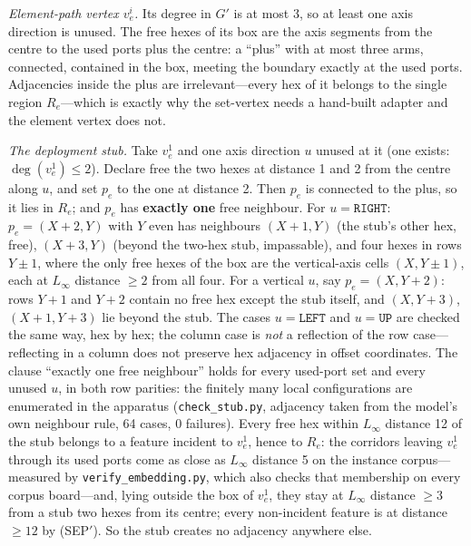\documentclass[11pt,a4paper]{article}
\theoremstyle{plain}
\theoremstyle{definition}
\theoremstyle{plain}
\theoremstyle{definition}
\theoremstyle{remark}
\newcommand{\src}[1]{\texttt{#1}}
\begin{document}
\emph{Element-path vertex $v_e^i$.} Its degree in $G'$ is at most 3, so at least one axis
direction is unused. The free hexes of its box are the axis segments from the centre to the used
ports plus the centre: a ``plus'' with at most three arms, connected, contained in the box,
meeting the boundary exactly at the used ports. Adjacencies inside the plus are
irrelevant---every hex of it belongs to the single region $R_e$---which is exactly why the
set-vertex needs a hand-built adapter and the element vertex does not.

\emph{The deployment stub.} Take $v_e^1$ and one axis direction $u$ unused at it (one exists:
$\deg(v_e^1)\le 2$). Declare free the two hexes at distance 1 and 2 from the centre along $u$,
and set $p_e$ to the one at distance 2. Then $p_e$ is connected to the plus, so it lies in $R_e$;
and $p_e$ has \textbf{exactly one} free neighbour. For $u=\texttt{RIGHT}$: $p_e=(X+2,Y)$ with $Y$
even has neighbours $(X+1,Y)$ (the stub's other hex, free), $(X+3,Y)$ (beyond the two-hex stub,
impassable), and four hexes in rows $Y\pm 1$, where the only free hexes of the box are the
vertical-axis cells $(X,Y\pm 1)$, each at $L_\infty$ distance $\ge 2$ from all four. For a
vertical $u$, say $p_e=(X,Y+2)$: rows $Y+1$ and $Y+2$ contain no free hex except the stub itself,
and $(X,Y+3)$, $(X+1,Y+3)$ lie beyond the stub. The cases $u=\texttt{LEFT}$ and $u=\texttt{UP}$
are checked the same way, hex by hex; the column case is \emph{not} a reflection of the row
case---reflecting in a column does not preserve hex adjacency in offset coordinates. The clause
``exactly one free neighbour'' holds for every used-port set and every unused $u$, in both row
parities: the finitely many local configurations are enumerated in the apparatus
(\src{check\_stub.py}, adjacency taken from the model's own neighbour rule, 64 cases, 0
failures). Every free hex within $L_\infty$ distance 12 of the stub belongs to a feature
incident to $v_e^1$, hence to $R_e$: the corridors leaving $v_e^1$ through its used ports
come as close as $L_\infty$ distance 5 on the instance corpus---measured by
\src{verify\_embedding.py}, which also checks that membership on every corpus board---and,
lying outside the box of $v_e^1$, they stay at $L_\infty$ distance $\ge 3$ from a stub two
hexes from its centre; every non-incident feature is at distance $\ge 12$ by (SEP$'$). So the
stub creates no adjacency anywhere else.
\end{document}
